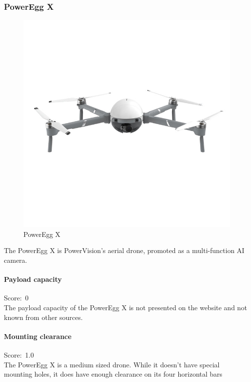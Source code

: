 \newpage
\subsubsection{PowerEgg X}
\begin{figure}
\includegraphics[width=1\linewidth]{uav/models/31_powereggx.jpg}
\caption{PowerEgg X}
\end{figure}
The PowerEgg X \cite{powereggx} is PowerVision's aerial drone, promoted as a multi-function AI camera.

\paragraph{Payload capacity}\mbox{Score: 0} \\
The payload capacity of the PowerEgg X is not presented on the website and not known from other sources.

\paragraph{Mounting clearance}\mbox{Score: 1.0} \\
The PowerEgg X is a medium sized drone. While it doesn't have special mounting holes, it does have enough clearance on its four horizontal bars

